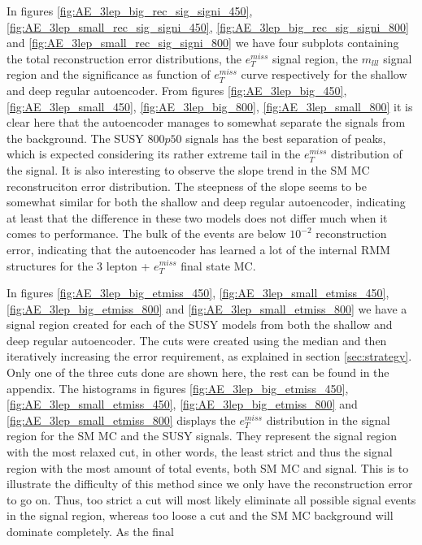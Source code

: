 In figures \ref{fig:AE_3lep_big_rec_sig_signi_450}, \ref{fig:AE_3lep_small_rec_sig_signi_450}, 
\ref{fig:AE_3lep_big_rec_sig_signi_800} and \ref{fig:AE_3lep_small_rec_sig_signi_800} we have four 
subplots containing the total reconstruction error distributions, the $e_T^{miss}$ signal region, 
the $m_{lll}$ signal region and the significance as function of $e_T^{miss}$ curve respectively 
for the shallow and deep regular autoencoder. From figures \ref{fig:AE_3lep_big_450}, 
\ref{fig:AE_3lep_small_450}, \ref{fig:AE_3lep_big_800}, \ref{fig:AE_3lep_small_800} it is clear 
here that the autoencoder manages to somewhat separate the signals from the background. The 
SUSY $800p50$ signals has the best separation of peaks, which is expected considering its 
rather extreme tail in the $e_T^{miss}$ distribution of the signal. It is also interesting to 
observe the slope trend in the SM MC reconstruciton error distribution. The steepness of the 
slope seems to be somewhat similar for both the shallow and deep regular autoencoder, indicating 
at least that the difference in these two models does not differ much when it comes to performance. 
The bulk of the events are below $10^{-2}$ reconstruction error, indicating that the autoencoder 
has learned a lot of the internal RMM structures for the 3 lepton + $e_T^{miss}$ final state MC. \par
In figures \ref{fig:AE_3lep_big_etmiss_450}, \ref{fig:AE_3lep_small_etmiss_450}, 
\ref{fig:AE_3lep_big_etmiss_800} and  \ref{fig:AE_3lep_small_etmiss_800} we have a signal region 
created for each of the SUSY models from both the shallow and deep regular autoencoder. The cuts 
were created using the median and then iteratively increasing the error requirement, as 
explained in section \ref{sec:strategy}. Only one of the three cuts done are shown here, the 
rest can be found in the appendix. The histograms in figures \ref{fig:AE_3lep_big_etmiss_450}, 
\ref{fig:AE_3lep_small_etmiss_450}, \ref{fig:AE_3lep_big_etmiss_800} and  
\ref{fig:AE_3lep_small_etmiss_800} displays the $e_T^{miss}$ distribution in the signal region 
for the SM MC and the SUSY signals. They represent the signal region with the most relaxed cut, 
in other words, the least strict and thus the signal region with the most amount of total events, 
both SM MC and signal. This is to illustrate the difficulty of this method since we only have the 
reconstruction error to go on. Thus, too strict a cut will most likely eliminate all possible 
signal events in the signal region, whereas too loose a cut and the SM MC background will dominate completely. As the final 
